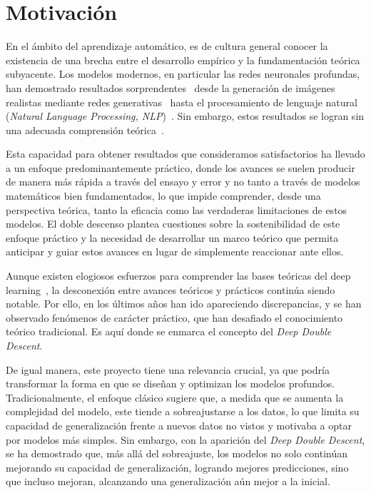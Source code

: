 \section{Motivación}

En el ámbito del aprendizaje automático, es de cultura general conocer la existencia de una brecha entre el desarrollo empírico y la fundamentación teórica subyacente. Los modelos modernos, en particular las redes neuronales profundas, han demostrado resultados sorprendentes~\cite{Sejnowski2020TheUE, He2020RecentAI} desde la generación de imágenes realistas mediante redes generativas~\cite{Elasri2022, Ruthotto2021} hasta el procesamiento de lenguaje natural (\textit{Natural Language Processing, NLP})~\cite{Kamath2019, Lauriola2022}. Sin embargo, estos resultados se logran sin una adecuada comprensión teórica~\cite{Ben-David2009, Berner2022}.\newline

Esta capacidad para obtener resultados que consideramos satisfactorios ha llevado a un enfoque predominantemente práctico, donde los avances se suelen producir de manera más rápida a través del ensayo y error y no tanto a través de modelos matemáticos bien fundamentados, lo que impide comprender, desde una perspectiva teórica, tanto la eficacia como las verdaderas limitaciones de estos modelos. El doble descenso plantea cuestiones sobre la sostenibilidad de este enfoque práctico y la necesidad de desarrollar un marco teórico que permita anticipar y guiar estos avances en lugar de simplemente reaccionar ante ellos.\newline

Aunque existen elogiosos esfuerzos para comprender las bases teóricas del deep learning~\cite{Zhang2021,Mallat2016, Prince2023, Bishop2023, Berner2022, Balestriero2018, Michael2018}, la desconexión entre avances teóricos y prácticos continúa siendo notable. Por ello, en los últimos años han ido apareciendo discrepancias, y se han observado fenómenos de carácter práctico, que han desafiado el conocimiento teórico tradicional. Es aquí donde se enmarca el concepto del \emph{Deep Double Descent}.\newline

De igual manera, este proyecto tiene una relevancia crucial, ya que podría transformar la forma en que se diseñan y optimizan los modelos profundos. Tradicionalmente, el enfoque clásico sugiere que, a medida que se aumenta la complejidad del modelo, este tiende a sobreajustarse a los datos, lo que limita su capacidad de generalización frente a nuevos datos no vistos y motivaba a optar por modelos más simples. Sin embargo, con la aparición del \textit{Deep Double Descent}, se ha demostrado que, más allá del sobreajuste, los modelos no solo continúan mejorando su capacidad de generalización, logrando mejores predicciones, sino que incluso mejoran, alcanzando una generalización aún mejor a la inicial.\newline 

